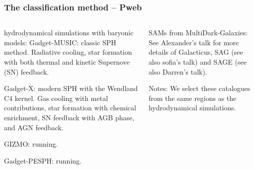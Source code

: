 \documentclass[aspectratio=43]{beamer}
\begin{document}
\begin{frame}
  \frametitle{The classification method -- Pweb}
  \begin{columns}[t]
    \begin{column}{0.55\textwidth}
      \begin{block}{hydrodynamical simulations with baryonic models:}
        {\sc Gadget-\alert{MUSIC}}: classic SPH method. Radiative cooling, star formation with both thermal and kinetic Supernove (SN) feedback.

        {\sc Gadget-\alert{X}}: modern SPH with the Wendland C4 kernel. Gas cooling with metal contributions, star formation with chemical enrichment, SN feedback with AGB phase, and AGN feedback.

        {\sc GIZMO:} running.

        {\sc Gadget-PESPH:} running.
      \end{block}
    \end{column}
    \begin{column}{0.4\textwidth}
      \begin{block}{SAMs from MultiDark-Galaxies:}
        See Alexander's talk for more details of {\sc Galacticus}, {\sc SAG} (see also sofia's talk) and {\sc SAGE} (see also Darren's talk).

        Notes: We select these catalogues from the same regions as the hydrodynamical simulations.
      \end{block}
    \end{column}
  \end{columns}
\end{frame}
\end{document}

